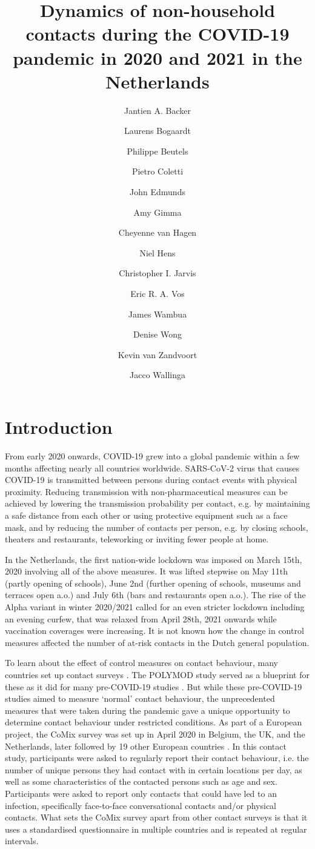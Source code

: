 \documentclass[fleqn,10pt]{wlscirep}
\title{Dynamics of non-household contacts during the COVID-19 pandemic in 2020 and 2021 in the Netherlands}
\author[1,*]{Jantien A. Backer}
\author[1]{Laurens Bogaardt}
\author[2]{Philippe Beutels}
\author[3]{Pietro Coletti}
\author[4]{John Edmunds}
\author[4]{Amy Gimma}
\author[1]{Cheyenne van Hagen}
\author[3]{Niel Hens}
\author[4]{Christopher I. Jarvis}
\author[1]{Eric R. A. Vos}
\author[3]{James Wambua}
\author[1]{Denise Wong}
\author[4]{Kevin van Zandvoort}
\author[1,5]{Jacco Wallinga}
\affil[1]{National Institute for Public Health and the Environment, Bilthoven, the Netherlands}
\affil[2]{University of Antwerp, Antwerp, Belgium}
\affil[3]{UHasselt, Data Science Institute and I-BioStat, Hasselt, Belgium}
\affil[4]{London School of Hygiene and Tropical Medicine, London, United Kingdom}
\affil[5]{Leiden University Medical Center, Leiden, the Netherlands}
\affil[*]{jantien.backer@rivm.nl}
\begin{document}
\flushbottom
\maketitle

\thispagestyle{empty}

\section*{Introduction}
From early 2020 onwards, COVID-19 grew into a global pandemic within a few months affecting nearly all countries worldwide. SARS-CoV-2 virus that causes COVID-19 is transmitted between persons during contact events with physical proximity. Reducing transmission with non-pharmaceutical measures can be achieved by lowering the transmission probability per contact, e.g. by maintaining a safe distance from each other or using protective equipment such as a face mask, and by reducing the number of contacts per person, e.g. by closing schools, theaters and restaurants, teleworking or inviting fewer people at home.

In the Netherlands, the first nation-wide lockdown was imposed on March 15th, 2020 involving all of the above measures. It was lifted stepwise on May 11th (partly opening of schools), June 2nd (further opening of schools, museums and terraces open a.o.) and July 6th (bars and restaurants open a.o.). The rise of the Alpha variant in winter 2020/2021 called for an even stricter lockdown including an evening curfew, that was relaxed from April 28th, 2021 onwards while vaccination coverages were increasing. It is not known how the change in control measures affected the number of at-risk contacts in the Dutch general population.

To learn about the effect of control measures on contact behaviour, many countries set up contact surveys \cite{Zhang_2020, Latsuzbaia_2020, Quaife_2020, Backer_2021, Bosetti_2021, Feehan_2021, Tomori_2021, Drolet_2022}. The POLYMOD study \cite{Mossong_2008} served as a blueprint for these as it did for many pre-COVID-19 studies \cite{Hoang_2019}. But while these pre-COVID-19 studies aimed to measure `normal' contact behaviour, the unprecedented measures that were taken during the pandemic gave a unique opportunity to determine contact behaviour under restricted conditions. As part of a European project, the CoMix survey was set up in April 2020 in Belgium, the UK, and the Netherlands, later followed by 19 other European countries \cite{Verelst_2021}. In this contact study, participants were asked to regularly report their contact behaviour, i.e. the number of unique persons they had contact with in certain locations per day, as well as some characteristics of the contacted persons such as age and sex. Participants were asked to report only contacts that could have led to an infection, specifically face-to-face conversational contacts and/or physical contacts. What sets the CoMix survey apart from other contact surveys is that it uses a standardised questionnaire in multiple countries and is repeated at regular intervals.
\end{document}
